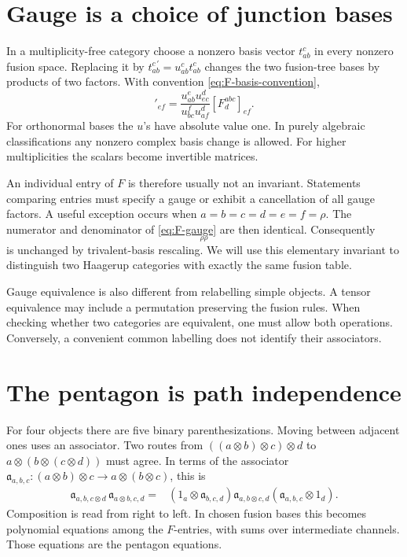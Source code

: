 \section{Gauge is a choice of junction bases}

In a multiplicity-free category choose a nonzero basis vector
$t_{ab}^{c}$ in every nonzero fusion space.  Replacing it by
$t_{ab}^{c\,\prime}=u_{ab}^{c}t_{ab}^{c}$ changes the two fusion-tree
bases by products of two factors.  With convention
\eqref{eq:F-basis-convention},
\begin{equation}
 [F^{abc}_{d}]'_{ef}
 =\frac{u_{ab}^{e}u_{ec}^{d}}
 {u_{bc}^{f}u_{af}^{d}}
 [F^{abc}_{d}]_{ef}.
 \label{eq:F-gauge}
\end{equation}
For orthonormal bases the $u$'s have absolute value one.  In purely
algebraic classifications any nonzero complex basis change is allowed.
For higher multiplicities the scalars become invertible matrices.

An individual entry of $F$ is therefore usually not an invariant.
Statements comparing entries must specify a gauge or exhibit a
cancellation of all gauge factors.  A useful exception occurs when
$a=b=c=d=e=f=\rho$.  The numerator and denominator of
\eqref{eq:F-gauge} are then identical.  Consequently
\begin{equation}
 [F^{\rho\rho\rho}_{\rho}]_{\rho\rho}
 \label{eq:rho-gauge-invariant}
\end{equation}
is unchanged by trivalent-basis rescaling.  We will use this elementary
invariant to distinguish two Haagerup categories with exactly the same
fusion table.

Gauge equivalence is also different from relabelling simple objects.
A tensor equivalence may include a permutation preserving the fusion
rules.  When checking whether two categories are equivalent, one must
allow both operations.  Conversely, a convenient common labelling
does not identify their associators.

\section{The pentagon is path independence}

For four objects there are five binary parenthesizations.  Moving
between adjacent ones uses an associator.  Two routes from
$((a\otimes b)\otimes c)\otimes d$ to
$a\otimes(b\otimes(c\otimes d))$ must agree.  In terms of the
associator $\mathfrak a_{a,b,c}:(a\otimes b)\otimes c\to
a\otimes(b\otimes c)$, this is
\begin{align}
 \mathfrak a_{a,b,c\otimes d}\,
 \mathfrak a_{a\otimes b,c,d}
 ={}&(1_a\otimes\mathfrak a_{b,c,d})
 \mathfrak a_{a,b\otimes c,d}
 (\mathfrak a_{a,b,c}\otimes1_d).
 \label{eq:pentagon-abstract}
\end{align}
Composition is read from right to left.  In chosen fusion bases this
becomes polynomial equations among the $F$-entries, with sums over
intermediate channels.  Those equations are the pentagon equations.

